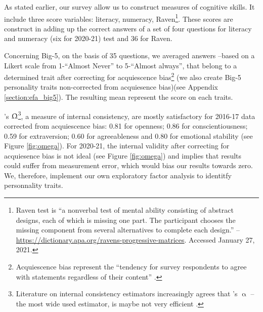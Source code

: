\documentclass[a4paper, 11pt, onecolumn]{article}
\begin{document}
As stated earlier, our survey allow us to construct measures of cognitive skills.
It include three score variables: literacy, numeracy, Raven\footnote{Raven test is ``a nonverbal test of mental ability consisting of abstract designs, each of which is missing one part. The participant chooses the missing component from several alternatives to complete each design.'' -- \url{https://dictionary.apa.org/ravens-progressive-matrices}. Accessed January 27, 2021.}.
These scores are construct in adding up the correct answers of a set of four questions for literacy and numeracy (six for 2020-21) test and 36 for Raven.

Concerning Big-5, on the basis of 35 questions, we averaged answers --based on a Likert scale from 1-``Almost Never'' to 5-``Almost always'', that belong to a determined trait after correcting for acquiescence bias\footnote{Acquiescence bias represent the ``tendency for survey respondents to agree with statements regardless of their content'' \citep{Lavrakas2008}.} (we also create Big-5 personality traits non-corrected from acquiesence bias)(see Appendix \ref{section:efa_big5}).
The resulting mean represent the score on each traits.

\citeauthor{McDonald1999}'s $\Upomega$\footnote{Literature on internal consistency estimators increasingly agrees that \citeauthor{Cronbach1951}'s $\upalpha$ --the most wide used estimator, is maybe not very efficient \citep{Bourque2019, TrizanoHermosilla2016}.}, a measure of internal consistency, are mostly satisfactory for 2016-17 data corrected from acquiescence bias: 0.81 for openness; 0.86 for conscientiousness; 0.59 for extraversion; 0.60 for agreeableness and 0.80 for emotional stability (see Figure \ref{fig:omega}).
For 2020-21, the internal validity after correcting for acquiesence bias is not ideal (see Figure \ref{fig:omega}) and implies that results could suffer from measurement error, which would bias our results towards zero.
We, therefore, implement our own exploratory factor analysis to identitfy personnality traits.
\end{document}

